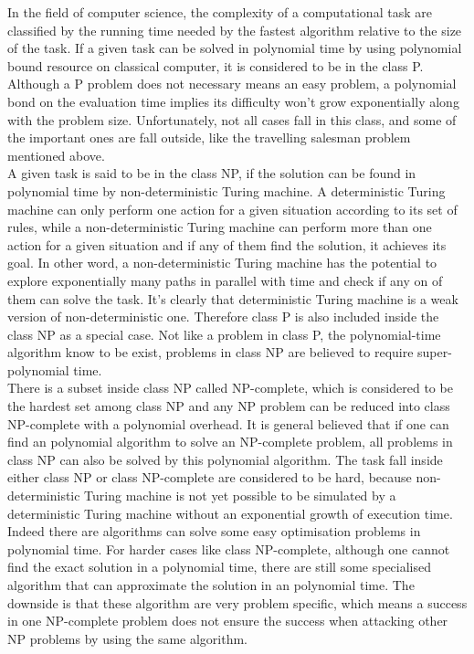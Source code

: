 \documentclass[twoside,a4paper,article]{combine}
\begin{document}
In the field of computer science, the complexity of a computational task are classified by the running time needed by the fastest algorithm relative to the size of the task. If a given task can be solved in polynomial time by using polynomial bound resource on classical computer, it is considered to be in the class P. Although a P problem does not necessary means an easy problem, a polynomial bond on the evaluation time implies its difficulty won't grow exponentially along with the problem size. Unfortunately, not all cases fall in this class, and some of the important ones are fall outside, like the travelling salesman problem mentioned above.\\

A given task is said to be in the class NP, if the solution can be found in polynomial time by non-deterministic Turing machine. A deterministic Turing machine can only perform one action for a given situation according to its set of rules, while a non-deterministic Turing machine can perform more than one action for a given situation and if any of them find the solution, it achieves its goal. In other word, a non-deterministic Turing machine has the potential to explore exponentially many paths in parallel with time and check if any on of them can solve the task. It's clearly that deterministic Turing machine is a weak version of non-deterministic one. Therefore class P is also included inside the class NP as a special case. Not like a problem in class P, the polynomial-time algorithm know to be exist, problems in class NP are believed to require super-polynomial time. \\

There is a subset inside class NP called NP-complete, which is considered to be the hardest set among class NP and any NP problem can be reduced into class NP-complete with a polynomial overhead. It is general believed that if one can find an polynomial algorithm to solve an NP-complete problem, all problems in class NP can also be solved by this polynomial algorithm.  The task fall inside either class NP or class NP-complete are considered to be hard, because non-deterministic Turing machine is not yet possible to be simulated by a deterministic Turing machine without an exponential growth of execution time. \\ 

Indeed there are algorithms can solve some easy optimisation problems in polynomial time. For harder cases like class NP-complete, although one cannot find the exact solution in a polynomial time, there are still some specialised algorithm that can approximate the solution in an polynomial time. The downside is that these algorithm are very problem specific, which means a success in one NP-complete problem does not ensure the success when attacking other NP problems by using the same algorithm. \\
\end{document}
